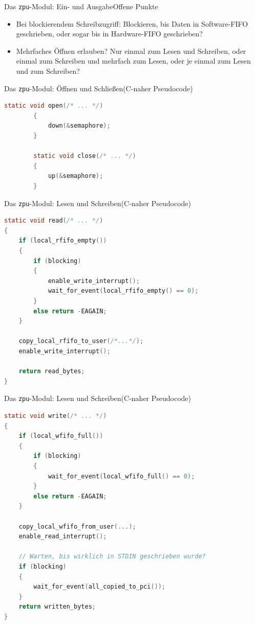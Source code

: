 \documentclass[10pt]{beamer}
\begin{document}
	\begin{frame}{Das \texttt{zpu}-Modul: Ein- und Ausgabe}{Offene Punkte}
		\begin{itemize}
			\item Bei blockierendem Schreibzugriff: Blockieren, bis Daten in Software-FIFO geschrieben, oder sogar bis in Hardware-FIFO geschrieben?
			\item Mehrfaches Öffnen erlauben? Nur einmal zum Lesen und Schreiben, oder einmal zum Schreiben und mehrfach zum Lesen, oder je einmal zum Lesen und zum Schreiben?
		\end{itemize}
	\end{frame}
	
	\begin{frame}[fragile]{Das \texttt{zpu}-Modul: Öffnen und Schließen}{(C-naher Pseudocode)}
		\begin{lstlisting}[language=C]
		static void open(/* ... */)
		{
		    down(&semaphore);
		}
		
		static void close(/* ... */)
		{
		    up(&semaphore);
		}
		\end{lstlisting}
	\end{frame}
	
	\begin{frame}[fragile]{Das \texttt{zpu}-Modul: Lesen und Schreiben}{(C-naher Pseudocode)}
		\begin{lstlisting}[language=C]
static void read(/* ... */)
{
    if (local_rfifo_empty())
    {
        if (blocking)
        {
            enable_write_interrupt();
            wait_for_event(local_rfifo_empty() == 0);
        }
        else return -EAGAIN;
    }
		    
    copy_local_rfifo_to_user(/*...*/);
    enable_write_interrupt();
		    
    return read_bytes;
}
		\end{lstlisting}
	\end{frame}
		
	\begin{frame}[fragile]{Das \texttt{zpu}-Modul: Lesen und Schreiben}{(C-naher Pseudocode)}
		\begin{lstlisting}[language=C,basicstyle=\footnotesize\ttfamily]
static void write(/* ... */)
{
    if (local_wfifo_full())
    {
        if (blocking)
        {
            wait_for_event(local_wfifo_full() == 0);
        }
        else return -EAGAIN;
    }
		    
    copy_local_wfifo_from_user(...);
    enable_read_interrupt();
		    
    // Warten, bis wirklich in STDIN geschrieben wurde?
    if (blocking)
    {
        wait_for_event(all_copied_to_pci());
    }
    return written_bytes;
}
		\end{lstlisting}
	\end{frame}
	
\end{document}

